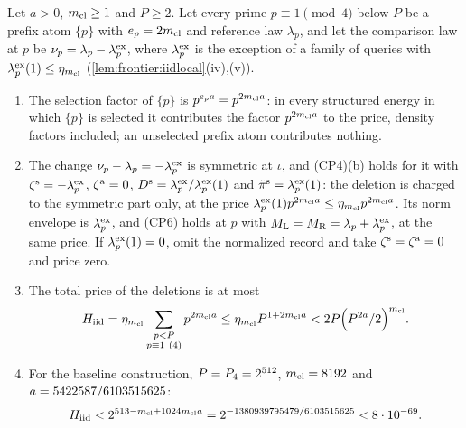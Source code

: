 \begin{lemma}\label{lem:frontier:iidenergy}
Let $a>0$, $m_{\mathrm{cl}}\ge1$ and $P\ge2$. Let every prime $p\equiv1\pmod4$ below $P$
be a prefix atom $\{p\}$ with $e_p=2m_{\mathrm{cl}}$ and reference law $\lambda_p$, and let
the comparison law at $p$ be $\nu_p=\lambda_p-\lambda^{\rm ex}_p$, where
$\lambda^{\rm ex}_p$ is the exception of a family of queries with
$\lambda^{\rm ex}_p(1)\le\eta_{m_{\mathrm{cl}}}$ (\cref{lem:frontier:iidlocal}(iv),(v)).
\begin{enumerate}[label=(\roman*)]
\item The selection factor of $\{p\}$ is $p^{e_pa}=p^{2m_{\mathrm{cl}} a}$: in every
 structured energy in which $\{p\}$ is selected it contributes the factor
 $p^{2m_{\mathrm{cl}} a}$ to the price, density factors included; an unselected prefix
 atom contributes nothing.
\item The change $\nu_p-\lambda_p=-\lambda^{\rm ex}_p$ is symmetric at $\iota$,
 and (CP4)(b) holds for it with $\zeta^{\rm s}=-\lambda^{\rm ex}_p$,
 $\zeta^{\rm a}=0$, $D^{\rm s}=\lambda^{\rm ex}_p/\lambda^{\rm ex}_p(1)$ and
 $\tilde\pi^{\rm s}=\lambda^{\rm ex}_p(1)$: the deletion is charged to the
 symmetric part only, at the price
 $\lambda^{\rm ex}_p(1)p^{2m_{\mathrm{cl}} a}\le\eta_{m_{\mathrm{cl}}}p^{2m_{\mathrm{cl}} a}$. Its norm envelope
 is $\lambda^{\rm ex}_p$, and (CP6) holds at $p$ with
 $M_{\rm L}=M_{\rm R}=\lambda_p+\lambda^{\rm ex}_p$, at the same price.
 If $\lambda^{\rm ex}_p(1)=0$, omit the normalized record and take
 $\zeta^{\rm s}=\zeta^{\rm a}=0$ and price zero.
\item The total price of the deletions is at most
 \[
  H_{\rm iid}=\eta_{m_{\mathrm{cl}}}\sum_{\substack{p<P\\p\equiv1\ (4)}}p^{2m_{\mathrm{cl}} a}
  \le\eta_{m_{\mathrm{cl}}}P^{1+2m_{\mathrm{cl}} a}<2P\Bigl(P^{2a}/2\Bigr)^{m_{\mathrm{cl}}} .
 \]
\item For the baseline construction, $P=P_4=2^{512}$, $m_{\mathrm{cl}}=8192$ and
 $a=5422587/6103515625$:
 \[
  H_{\rm iid}<2^{513-m_{\mathrm{cl}}+1024m_{\mathrm{cl}} a}=2^{-1380939795479/6103515625}
  <8\cdot10^{-69}.
 \]
\end{enumerate}
\end{lemma}

